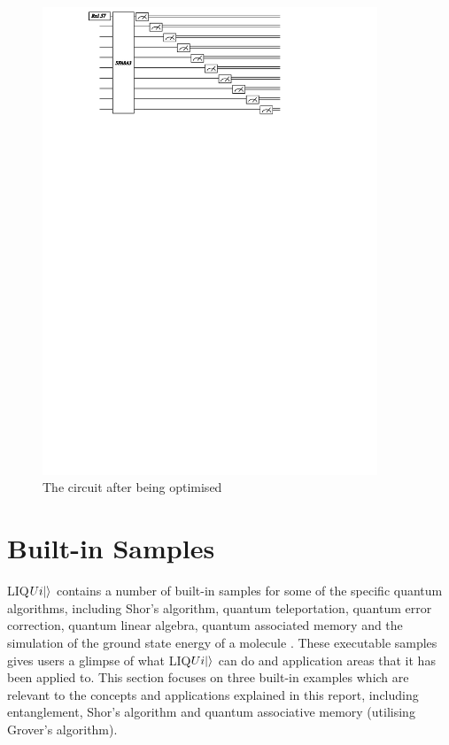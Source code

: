 \documentclass[12pt]{third-rep}
\begin{document}
\begin{figure}[ht]
\centering
\includegraphics[width=10cm]{circuit2}
\caption{The circuit after being optimised}
\end{figure}

\section{Built-in Samples}
LIQ$Ui{\left\vert{}\right\rangle}$ contains a number of built-in samples for some of the specific quantum algorithms, including Shor’s algorithm, quantum teleportation, quantum error correction, quantum linear algebra, quantum associated memory and the simulation of the ground state energy of a molecule \cite{liquid-manual}. These executable samples gives users a glimpse of what LIQ$Ui{\left\vert{}\right\rangle}$ can do and application areas that it has been applied to. This section focuses on three built-in examples which are relevant to the concepts and applications explained in this report, including entanglement, Shor’s algorithm and quantum associative memory (utilising Grover’s algorithm).
\end{document}
